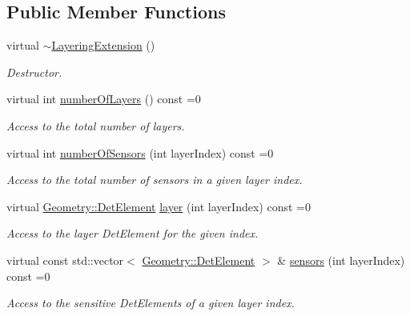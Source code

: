 \subsection*{Public Member Functions}
\begin{DoxyCompactItemize}
\item 
virtual \hyperlink{class_d_d4hep_1_1_d_d_rec_1_1_layering_extension_aab6b9c7fe676917e07c53cffbdd87767}{$\sim$LayeringExtension} ()
\begin{DoxyCompactList}\small\item\em Destructor. \item\end{DoxyCompactList}\item 
virtual int \hyperlink{class_d_d4hep_1_1_d_d_rec_1_1_layering_extension_a2a0ee0e2bdb875de6573591e2648e446}{numberOfLayers} () const =0
\begin{DoxyCompactList}\small\item\em Access to the total number of layers. \item\end{DoxyCompactList}\item 
virtual int \hyperlink{class_d_d4hep_1_1_d_d_rec_1_1_layering_extension_a91d00c26112a0456117d1036db335e5d}{numberOfSensors} (int layerIndex) const =0
\begin{DoxyCompactList}\small\item\em Access to the total number of sensors in a given layer index. \item\end{DoxyCompactList}\item 
virtual \hyperlink{class_d_d4hep_1_1_geometry_1_1_det_element}{Geometry::DetElement} \hyperlink{class_d_d4hep_1_1_d_d_rec_1_1_layering_extension_a080be80c3277feaa59828b829d29c747}{layer} (int layerIndex) const =0
\begin{DoxyCompactList}\small\item\em Access to the layer DetElement for the given index. \item\end{DoxyCompactList}\item 
virtual const std::vector$<$ \hyperlink{class_d_d4hep_1_1_geometry_1_1_det_element}{Geometry::DetElement} $>$ \& \hyperlink{class_d_d4hep_1_1_d_d_rec_1_1_layering_extension_a832e6f67c9e507b89f8f41d0a5cc0025}{sensors} (int layerIndex) const =0
\begin{DoxyCompactList}\small\item\em Access to the sensitive DetElements of a given layer index. \item\end{DoxyCompactList}\item 

\end{DoxyCompactItemize}
